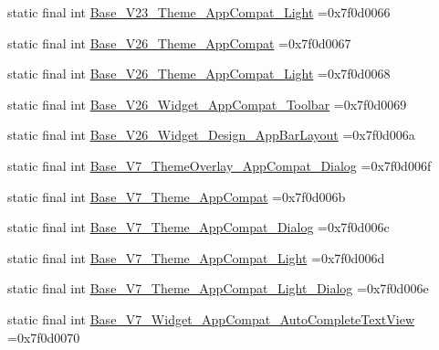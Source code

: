 \begin{DoxyCompactItemize}
\item 
static final int \mbox{\hyperlink{classbr_1_1unb_1_1cic_1_1mp_1_1marketmaster_1_1R_1_1style_aaa4e6782ad658e73abf8b437b8a73bad}{Base\+\_\+\+V23\+\_\+\+Theme\+\_\+\+App\+Compat\+\_\+\+Light}} =0x7f0d0066
\item 
static final int \mbox{\hyperlink{classbr_1_1unb_1_1cic_1_1mp_1_1marketmaster_1_1R_1_1style_adbcc3b2b85a2c83fefe80db73f31e768}{Base\+\_\+\+V26\+\_\+\+Theme\+\_\+\+App\+Compat}} =0x7f0d0067
\item 
static final int \mbox{\hyperlink{classbr_1_1unb_1_1cic_1_1mp_1_1marketmaster_1_1R_1_1style_af8c0e8486b9f14b1a78bffe0f63c144e}{Base\+\_\+\+V26\+\_\+\+Theme\+\_\+\+App\+Compat\+\_\+\+Light}} =0x7f0d0068
\item 
static final int \mbox{\hyperlink{classbr_1_1unb_1_1cic_1_1mp_1_1marketmaster_1_1R_1_1style_a43c4816d4dfbec3e0a3237cf581ea7b5}{Base\+\_\+\+V26\+\_\+\+Widget\+\_\+\+App\+Compat\+\_\+\+Toolbar}} =0x7f0d0069
\item 
static final int \mbox{\hyperlink{classbr_1_1unb_1_1cic_1_1mp_1_1marketmaster_1_1R_1_1style_a80f00295aee3e1c8d6f3aefdce817a4d}{Base\+\_\+\+V26\+\_\+\+Widget\+\_\+\+Design\+\_\+\+App\+Bar\+Layout}} =0x7f0d006a
\item 
static final int \mbox{\hyperlink{classbr_1_1unb_1_1cic_1_1mp_1_1marketmaster_1_1R_1_1style_a8c6675bdce608863e82595be9fca6cc8}{Base\+\_\+\+V7\+\_\+\+Theme\+Overlay\+\_\+\+App\+Compat\+\_\+\+Dialog}} =0x7f0d006f
\item 
static final int \mbox{\hyperlink{classbr_1_1unb_1_1cic_1_1mp_1_1marketmaster_1_1R_1_1style_aa2be00a81376dfd4522b9f75d71661c0}{Base\+\_\+\+V7\+\_\+\+Theme\+\_\+\+App\+Compat}} =0x7f0d006b
\item 
static final int \mbox{\hyperlink{classbr_1_1unb_1_1cic_1_1mp_1_1marketmaster_1_1R_1_1style_aef35e00145c86c84a22cc613487d6f07}{Base\+\_\+\+V7\+\_\+\+Theme\+\_\+\+App\+Compat\+\_\+\+Dialog}} =0x7f0d006c
\item 
static final int \mbox{\hyperlink{classbr_1_1unb_1_1cic_1_1mp_1_1marketmaster_1_1R_1_1style_acec5343b8a158a27ddd17fa37ff1975e}{Base\+\_\+\+V7\+\_\+\+Theme\+\_\+\+App\+Compat\+\_\+\+Light}} =0x7f0d006d
\item 
static final int \mbox{\hyperlink{classbr_1_1unb_1_1cic_1_1mp_1_1marketmaster_1_1R_1_1style_a8d6d617e0d095d2b0e4b2d727307971c}{Base\+\_\+\+V7\+\_\+\+Theme\+\_\+\+App\+Compat\+\_\+\+Light\+\_\+\+Dialog}} =0x7f0d006e
\item 
static final int \mbox{\hyperlink{classbr_1_1unb_1_1cic_1_1mp_1_1marketmaster_1_1R_1_1style_aac52fce3999c797c9f978933f6c301df}{Base\+\_\+\+V7\+\_\+\+Widget\+\_\+\+App\+Compat\+\_\+\+Auto\+Complete\+Text\+View}} =0x7f0d0070

\end{DoxyCompactItemize}

